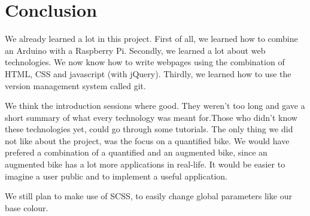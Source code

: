 \section{Conclusion}
We already learned a lot in this project. First of all, we learned how to combine an
Arduino with a Raspberry Pi. Secondly, we learned a lot about web technologies. We now
know how to write webpages using the combination of HTML, CSS and javascript (with
jQuery). Thirdly, we learned how to use the version management system called git.

We think the introduction sessions where good. They weren't too long and gave a short summary of what every technology was meant for.Those who didn't know these
technologies yet, could go through some tutorials. The only thing we did not like about the project, was the focus on 
a quantified bike. We would have prefered a combination of a quantified and an augmented bike, since an augmented bike
has a lot more applications in real-life. It would be easier to imagine a user public and to implement a useful application.

We still plan to make use of SCSS, to easily change global parameters like our base colour.
